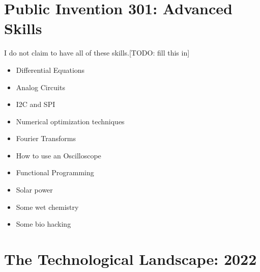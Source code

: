 \documentclass[
	fontsize=10pt, %
	twoside=false, %
	secnumdepth=1, %
]{kaobook}
\begin{document}
\chapter{Public Invention 301: Advanced Skills}


I do not claim to have all of these skills.[TODO: fill this in]

\begin{itemize}
\item Differential Equations
\item Analog Circuits
  \item I2C and SPI
\item Numerical optimization techniques
\item Fourier Transforms
\item How to use an Oscilloscope
\item Functional Programming
\item Solar power
\item Some wet chemistry
  \item Some bio hacking
  \end{itemize}

\chapter{The Technological Landscape: 2022}
\end{document}
